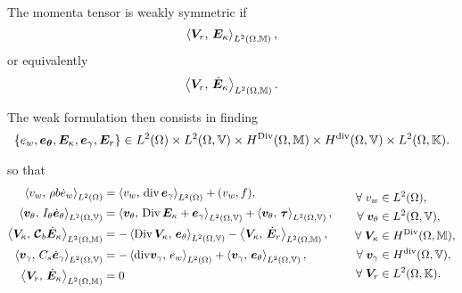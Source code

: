 The momenta tensor is weakly symmetric if 
$$\inner[L^2(\Omega, \mathbb{M})]{\bm{V}_r}{\bm{E}_{\kappa}},$$
or equivalently 
$$\inner[L^2(\Omega, \mathbb{M})]{\bm{V}_r}{\dot{\bm{E}}_{\kappa}}.$$

The weak formulation then consists in finding 
\[
\{e_w, \bm{e}_{\bm{\theta}}, \bm{E}_{\kappa}, \bm{e}_{\gamma}, \bm{E}_{r}\} \in L^2(\Omega) \times L^2(\Omega, \mathbb{V}) \times H^{\Div}(\Omega, \mathbb{M}) \times H^{\div}(\Omega, \mathbb{V}) \times L^2(\Omega, \mathbb{K}).
\]



so that 
\begin{equation}
\label{eq:weak_min_div_weak}
\begin{aligned}
\inner[L^2(\Omega)]{v_w}{\rho b \dot{e}_w} &= \inner[L^2(\Omega)]{v_w}{\div \bm{e}_\gamma} + (v_w, f), \\ 
\inner[L^2(\Omega, \mathbb{V})]{\bm{v}_\theta}{I_\theta \dot{\bm{e}}_\theta} &= \inner[L^2(\Omega, \mathbb{V})]{\bm{v}_\theta}{\Div \bm{E}_\kappa + \bm{e}_\gamma} + \inner[L^2(\Omega, \mathbb{V})]{\bm{v}_\theta}{\bm{\tau}}, \\  
\inner[L^2(\Omega, \mathbb{M})]{\bm{V}_\kappa}{\bm{\mathcal{C}}_{b} \dot{\bm{E}}_\kappa} &= -\inner[L^2(\Omega, \mathbb{V})]{\Div \bm{V}_\kappa}{\bm{e}_\theta} -  \inner[L^2(\Omega, \mathbb{M})]{\bm{V}_\kappa}{\dot{\bm{E}}_r}, \\ 
\inner[L^2(\Omega, \mathbb{V})]{\bm{v}_\gamma}{C_s \dot{\bm{e}}_\gamma} &= -\inner[L^2(\Omega)]{\mathrm{div} \bm{v}_\gamma}{e_w} + \inner[L^2(\Omega, \mathbb{V})]{\bm{v}_\gamma}{\bm{e}_{\theta}}, \\   
\inner[L^2(\Omega, \mathbb{M})]{\bm{V}_r}{\dot{\bm{E}}_\kappa} &= 0
\end{aligned} \qquad
\begin{aligned}
\forall \;v_w &\in L^2(\Omega), \\
\forall \; \bm{v}_\theta &\in L^2(\Omega, \mathbb{V}), \\
\forall \;\bm{V}_\kappa &\in H^{\Div}(\Omega, \mathbb{M}), \\
\forall \;\bm{v}_\gamma &\in H^{\div}(\Omega, \mathbb{V}), \\
\forall \;\bm{V}_r &\in L^2(\Omega, \mathbb{K}).\\
\end{aligned}
\end{equation}

